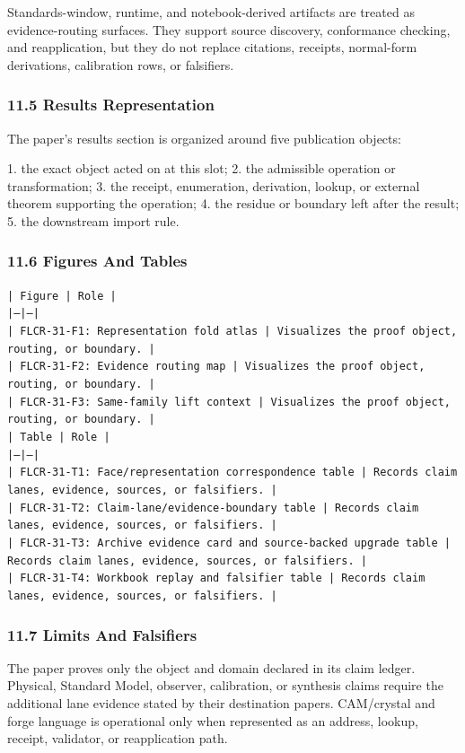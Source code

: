 \documentclass[11pt]{article}
\begin{document}
Standards-window, runtime, and notebook-derived artifacts are treated
as evidence-routing surfaces. They support source discovery, conformance
checking, and reapplication, but they do not replace citations, receipts,
normal-form derivations, calibration rows, or falsifiers.

\subsubsection*{11.5 Results Representation}

The paper's results section is organized around five publication objects:

1. the exact object acted on at this slot;
2. the admissible operation or transformation;
3. the receipt, enumeration, derivation, lookup, or external theorem supporting
   the operation;
4. the residue or boundary left after the result;
5. the downstream import rule.

\subsubsection*{11.6 Figures And Tables}

\noindent\texttt{| Figure | Role |}\\
\noindent\texttt{|---|---|}\\
\noindent\texttt{| FLCR-31-F1: Representation fold atlas | Visualizes the proof object, routing, or boundary. |}\\
\noindent\texttt{| FLCR-31-F2: Evidence routing map | Visualizes the proof object, routing, or boundary. |}\\
\noindent\texttt{| FLCR-31-F3: Same-family lift context | Visualizes the proof object, routing, or boundary. |}\\

\noindent\texttt{| Table | Role |}\\
\noindent\texttt{|---|---|}\\
\noindent\texttt{| FLCR-31-T1: Face/representation correspondence table | Records claim lanes, evidence, sources, or falsifiers. |}\\
\noindent\texttt{| FLCR-31-T2: Claim-lane/evidence-boundary table | Records claim lanes, evidence, sources, or falsifiers. |}\\
\noindent\texttt{| FLCR-31-T3: Archive evidence card and source-backed upgrade table | Records claim lanes, evidence, sources, or falsifiers. |}\\
\noindent\texttt{| FLCR-31-T4: Workbook replay and falsifier table | Records claim lanes, evidence, sources, or falsifiers. |}\\

\subsubsection*{11.7 Limits And Falsifiers}

The paper proves only the object and domain declared in its claim ledger.
Physical, Standard Model, observer, calibration, or synthesis claims require
the additional lane evidence stated by their destination papers. CAM/crystal
and forge language is operational only when represented as an address, lookup,
receipt, validator, or reapplication path.
\end{document}
